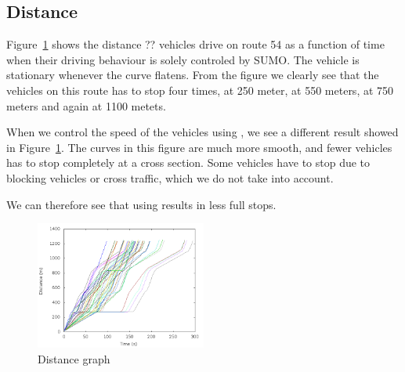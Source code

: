 \subsection{Distance}
Figure~\ref{fig:TestResults:distance100} shows the distance ?? vehicles drive on route 54 as a function of time when their driving behaviour is solely controled by SUMO. 
The vehicle is stationary whenever the curve flatens.
From the figure we clearly see that the vehicles on this route has to stop four times, at 250 meter, at 550 meters, at 750 meters and again at 1100 metets.

When we control the speed of the vehicles using \tech, we see a different result showed in Figure~\ref{fig:TestResults:distance100}.
The curves in this figure are much more smooth, and fewer vehicles has to stop completely at a cross section.
Some vehicles have to stop due to blocking vehicles or cross traffic, which we do not take into account.

We can therefore see that using \tech results in less full stops.


\begin{figure}[htb]
\includegraphics[width=0.5\textwidth]{images/distance100.png}
\caption{Distance graph}
\label{fig:TestResults:distance100}
\end{figure}

